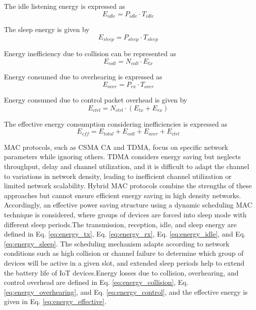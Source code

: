 \documentclass[a4paper,fleqn]{cas-dc}
\numberwithin{equation}{section}
\begin{document}
The idle listening energy is expressed as
\begin{equation}
E_{idle} = P_{idle} \cdot T_{idle}
\label{eq:energy_idle}
\end{equation}

The sleep energy is given by
\begin{equation}
E_{sleep} = P_{sleep} \cdot T_{sleep}
\label{eq:energy_sleep}
\end{equation}

Energy inefficiency due to collision can be represented as
\begin{equation}
E_{coll} = N_{coll} \cdot E_{tx}
\label{eq:energy_collision}
\end{equation}

Energy consumed due to overhearing is expressed as
\begin{equation}
E_{over} = P_{rx} \cdot T_{over}
\label{eq:energy_overhearing}
\end{equation}

Energy consumed due to control packet overhead is given by
\begin{equation}
E_{ctrl} = N_{ctrl} \cdot (E_{tx} + E_{rx})
\label{eq:energy_control}
\end{equation}

The effective energy consumption considering inefficiencies is expressed as
\begin{equation}
E_{eff} = E_{total} + E_{coll} + E_{over} + E_{ctrl}
\label{eq:energy_effective}
\end{equation}


MAC protocols, such as CSMA CA and TDMA, focus on specific network parameters while ignoring others. TDMA considers energy saving but neglects throughput, delay and channel utilization, and it is difficult to adapt the channel to variations in network density, leading to inefficient channel utilization or limited network scalability. Hybrid MAC protocols combine the strengths of these approaches but cannot ensure efficient energy saving in high density networks. Accordingly, an effective power saving structure using a dynamic scheduling MAC technique is considered, where groups of devices are forced into sleep mode with different sleep periods.The transmission, reception, idle, and sleep energy are defined in Eq. \ref{eq:energy_tx}, Eq. \ref{eq:energy_rx}, Eq. \ref{eq:energy_idle}, and Eq. \ref{eq:energy_sleep}. The scheduling mechanism adapts according to network conditions such as high collision or channel failure to determine which group of devices will be active in a given slot, and extended sleep periods help to extend the battery life of IoT devices.Energy losses due to collision, overhearing, and control overhead are defined in Eq. \ref{eq:energy_collision}, Eq. \ref{eq:energy_overhearing}, and Eq. \ref{eq:energy_control}, and the effective energy is given in Eq. \ref{eq:energy_effective}.
\end{document}
